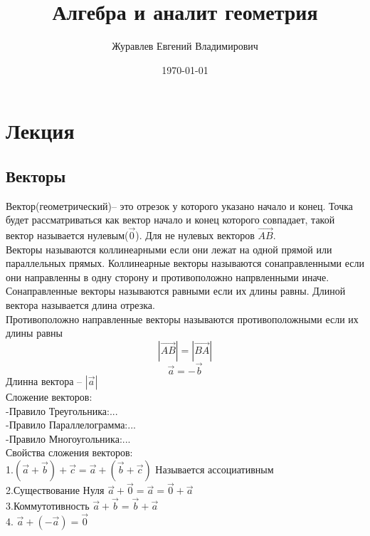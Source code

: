 \documentclass[a4paper, 12pt]{article}
\title{Алгебра и аналит геометрия }
\author{Журавлев Евгений Владимирович}
\date{\today}
\begin{document}
\sffamily
\maketitle
\section{Лекция}
\subsection{Векторы}
Вектор(геометрический)-- это отрезок у которого указано начало и конец.
Точка будет рассматриваться как вектор начало и конец которого совпадает, такой вектор называется нулевым($\vec{0}$). Для не нулевых векторов $  \vec{AB}$.\\
Векторы называются коллинеарными если они лежат на одной прямой или параллельных прямых. Коллинеарные векторы называются сонаправленными если они направленны в одну сторону и противоположно напрвленными иначе.\\
Сонаправленные векторы называются равными если их длины равны. Длиной вектора называется длина отрезка.\\
Противоположно направленные векторы называются противоположными если их длины равны \[
	|\vec{AB}| = |\vec{BA}|
\] 
\[
	\vec{a} = -\vec{b}		
\]
Длинна вектора -- $|\vec{a}|$\\
Сложение векторов: \\
-Правило Треугольника:...\\
-Правило Параллелограмма:...\\
-Правило Многоугольника:...\\
Свойства сложения векторов:\\
1.$ (\vec{a} + \vec{b})+\vec{c} = \vec{a} + (\vec{b}+\vec{c}) $ Называется ассоциативным\\
2.Существование Нуля $ \vec{a} + \vec{0} = \vec{a} = \vec{0} + \vec{a} $\\
3.Коммутотивность $ \vec{a} + \vec{b}= \vec{b} + \vec{a} $\\
4. $ \vec{a} + (-\vec{a}) = \vec{0} $\\
\end{document}
